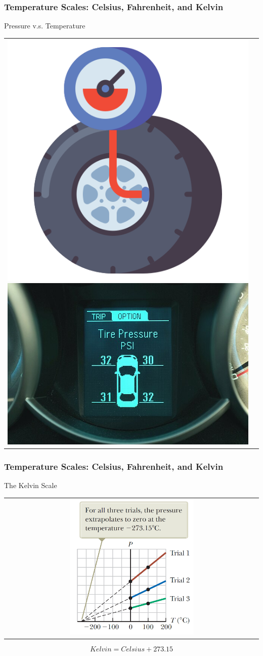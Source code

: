 \documentclass[10pt]{beamer}
\begin{document}
\begin{frame}
\frametitle{Temperature Scales: Celsius, Fahrenheit, and Kelvin}
Pressure v.s. Temperature

\begin{center}
\begin{tabular}{cc}
\includegraphics[width=.45\textwidth]{tire-pressure.png}
\includegraphics[width=.45\textwidth]{tire-pressure-meter.jpg}
\end{tabular}
\end{center}
\end{frame}


\begin{frame}
\frametitle{Temperature Scales: Celsius, Fahrenheit, and Kelvin}
The Kelvin Scale

\begin{center}
\begin{tabular}{c}
\includegraphics[width=0.5\textwidth]{Kelvin.png}
\end{tabular}
\pause
\[
Kelvin = Celsius + 273.15
\]
\end{center}
\end{frame}
\end{document}
